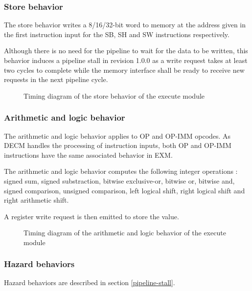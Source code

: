 

\subsubsection{Store behavior}

\begin{content}
    The store behavior writes a 8/16/32-bit word to memory at the address given in the first instruction input for the SB, SH and SW instructions respectively.

    Although there is no need for the pipeline to wait for the data to be written, this behavior induces a pipeline stall in revision 1.0.0 as a write request takes at least two cycles to complete while the memory interface shall be ready to receive new requests in the next pipeline cycle.
\end{content}

\begin{figure}[H]
    \centering
    
    \caption{Timing diagram of the store behavior of the execute module}
    \label{fig:exm-behavior-store}
\end{figure}



\subsubsection{Arithmetic and logic behavior}

\begin{content}
  The arithmetic and logic behavior applies to OP and OP-IMM opcodes. As DECM handles the processing of instruction inputs, both OP and OP-IMM instructions have the same associated behavior in EXM.

  The arithmetic and logic behavior computes the following integer operations : signed sum, signed substraction, bitwise exclusive-or, bitwise or, bitwise and, signed comparison, unsigned comparison, left logical shift, right logical shift and right arithmetic shift.
  
  A register write request is then emitted to store the value.
\end{content}

\begin{figure}[H]
    \centering
    
    \caption{Timing diagram of the arithmetic and logic behavior of the execute module}
    \label{fig:exm-behavior-arithmetic-logic}
\end{figure}



\subsubsection{Hazard behaviors}

\begin{content}
  Hazard behaviors are described in section \ref{pipeline-stall}.
\end{content}

\newpage
